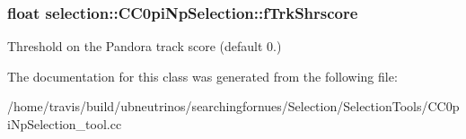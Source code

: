\subsubsection[{\texorpdfstring{f\+Trk\+Shrscore}{fTrkShrscore}}]{\setlength{\rightskip}{0pt plus 5cm}float selection\+::\+C\+C0pi\+Np\+Selection\+::f\+Trk\+Shrscore\hspace{0.3cm}{\ttfamily [private]}}\hypertarget{classselection_1_1CC0piNpSelection_ab72eccf7dab3acafa294a0d8f3e225a0}{}\label{classselection_1_1CC0piNpSelection_ab72eccf7dab3acafa294a0d8f3e225a0}
Threshold on the Pandora track score (default 0.) 

The documentation for this class was generated from the following file\+:\begin{DoxyCompactItemize}
\item 
/home/travis/build/ubneutrinos/searchingfornues/\+Selection/\+Selection\+Tools/C\+C0pi\+Np\+Selection\+\_\+tool.\+cc\end{DoxyCompactItemize}
